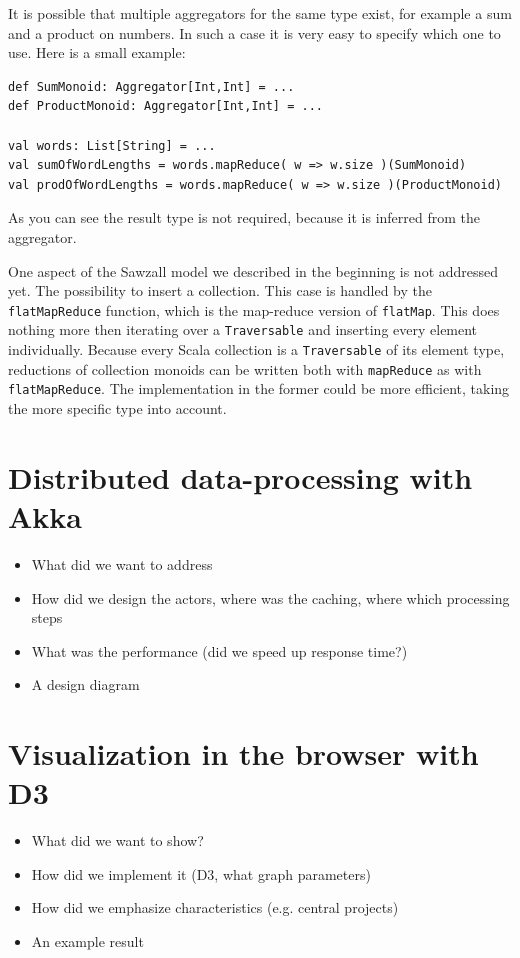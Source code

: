 \documentclass[10pt,a4paper]{article}
\begin{document}
It is possible that multiple aggregators for the same type exist, for example a sum and a product on numbers. In such a case it is very easy to specify which one to use. Here is a small example:
\begin{lstlisting}
def SumMonoid: Aggregator[Int,Int] = ...
def ProductMonoid: Aggregator[Int,Int] = ...

val words: List[String] = ...
val sumOfWordLengths = words.mapReduce( w => w.size )(SumMonoid)
val prodOfWordLengths = words.mapReduce( w => w.size )(ProductMonoid)
\end{lstlisting}
As you can see the result type is not required, because it is inferred from the aggregator.

One aspect of the Sawzall model we described in the beginning is not addressed yet. The possibility to insert a collection. This case is handled by the \lstinline|flatMapReduce| function, which is the map-reduce version of \lstinline|flatMap|. This does nothing more then iterating over a \lstinline|Traversable| and inserting every element individually. Because every Scala collection is a \lstinline|Traversable| of its element type, reductions of collection monoids can be written both with \lstinline|mapReduce| as with \lstinline|flatMapReduce|. The implementation in the former could be more efficient, taking the more specific type into account.

\section{Distributed data-processing with Akka}\label{sec:distributed}

\begin{itemize}
    \item What did we want to address
    \item How did we design the actors, where was the caching, where which processing steps
    \item What was the performance (did we speed up response time?)
    \item A design diagram
\end{itemize}

\section{Visualization in the browser with D3}\label{sec:visualization}

\begin{itemize}
    \item What did we want to show?
    \item How did we implement it (D3, what graph parameters)
    \item How did we emphasize characteristics (e.g. central projects)
    \item An example result
\end{itemize}
\end{document}
